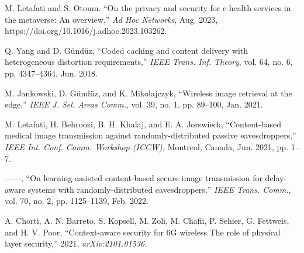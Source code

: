 \documentclass[conference]{IEEEtran}
\begin{document}
{{\begin{thebibliography}{10}
		
	M. Letafati and S. Otoum. ``On the privacy and security for e-health services in the metaverse: An overview,'' \emph{Ad Hoc Networks}, Aug. 2023, https://doi.org/10.1016/j.adhoc.2023.103262. 
	
	Q. Yang and D. Gündüz, ``Coded caching and content delivery with heterogeneous distortion requirements,'' \emph{IEEE Trans. Inf. Theory}, vol. 64, no. 6, pp. 4347--4364, Jun. 2018.
	
	M. Jankowski, D. Gündüz,  and K. Mikolajczyk, ``Wireless image retrieval at the edge,'' \emph{IEEE J. Sel. Areas Comm.}, vol. 39, no. 1, pp. 89--100, Jan. 2021.  
	
	
	
	M. 
	Letafati, H. Behroozi, B. H. Khalaj, and E. A. Jorswieck, 	``Content-based medical image transmission against randomly-distributed passive eavesdroppers,'' \emph{IEEE Int. Conf. Comm. Workshop (ICCW),} Montreal, Canada, Jun. 2021, pp. 1--7.
	
	
	------, ``On learning-assisted content-based secure image transmission for delay-aware systems with randomly-distributed eavesdroppers,'' \emph{IEEE Trans.  Comm.},  vol. 70, no. 2, pp. 1125--1139, Feb. 2022.	
	
		
		A. Chorti, A. N. Barreto, S. Kopsell,  M. Zoli,  M. Chafii,  P. Sehier, G. Fettweis, and H. V. Poor, ``Context-aware security for 6G wireless The role of physical layer security,'' 2021, \emph{arXiv:2101.01536.}
		
	
	 
	
		

\end{thebibliography}}}
\end{document}
